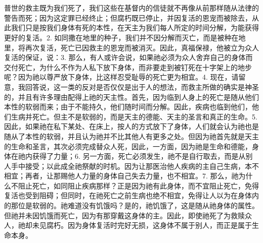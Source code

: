 
\section{}

普世的救主既为我们死了，我们这些在基督内的信徒就不再像从前那样随从法律的警告而死；因为这定罪已经终止；但腐朽既已停止，并因复活的恩宠而被除去，从此我们只是按我们身体有死的本性，在天主为我们每人所定的时间分解，为能获得更好的复活。\newline{}2. 如同撒在地里的种子，我们并不因分解而灭亡，而是被种在地里，将再次复活，死亡已因救主的恩宠而被消灭。因此，真福保禄，他被立为众人复活的保证，说：\newline{}3. 那么，有人或许会说，如果祂必须为众人舍弃自己的身体而交付死亡，为什么不作为人私下放下身体，而非要走到被钉死在十字架上的地步呢？因为祂以尊严放下身体，比这样忍受耻辱的死亡更为相宜。\newline{}4. 现在，请留意，我回答说，这一类的反对是否仅仅是出于人的想法，而救主所做的确实是神圣的，并且有许多理由配得上祂的天主性。首先，因为临到人身上的死亡是随从他们本性的软弱而来；由于不能持久，他们随时间而分解。因此，疾病也临到他们，他们生病并死亡。但主不是软弱的，而是天主的德能、天主的圣言和真正的生命。\newline{}5. 因此，如果祂在私下某处、在床上，按人的方式放下了身体，人们就会认为祂也是随从了本性的软弱，并且认为祂并不比其他人有更多之处。但因为祂首先就是天主的生命和圣言，其次必须完成替众人死，因此，一方面，因为祂是生命和德能，身体在祂内获得了力量；\newline{}6. 另一方面，死亡必须发生，祂不是自行取去，而是从别人手中接受；以此成全祂祭献的时机。因为让那医治他人疾病的主自己生病，本不相宜；再者，让那赐他人力量的身体自己失去力量，也不相宜。\newline{}7. 那么，祂为什么不阻止死亡，如同阻止疾病那样？正是因为祂有此身体，而不宜阻止死亡，免得复活也受到阻碍；但同时，在祂死亡之前生病也绝不相宜，免得让人以为在身体内的那位是软弱的。祂难道没有饥饿吗？是的，祂饥饿了，这是随从祂身体的属性。但祂并未因饥饿而死亡，因为有那穿戴这身体的主。因此，即使祂死了为救赎众人，祂却未见腐朽。因为身体复活时完好无损，这身体不属于别人，而正是属于生命本身。\par

